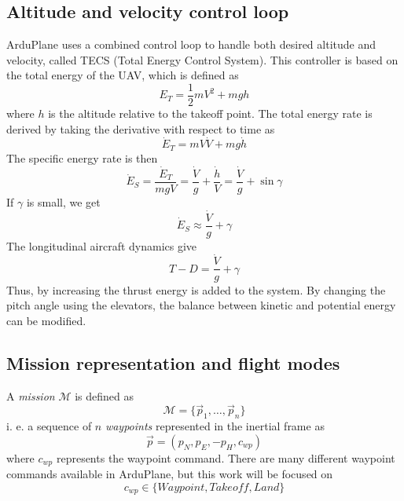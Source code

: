 \subsection{Altitude and velocity control loop}
ArduPlane uses a combined control loop to handle both desired altitude and velocity, called 
TECS (Total Energy Control System). This controller is based on the total energy of the UAV,
which is defined as
\begin{equation}
    E_T=\frac{1}{2}mV^2 + mgh
\end{equation}
where $h$ is the altitude relative to the takeoff point. The total energy rate is derived
by taking the derivative with respect to time as
\begin{equation}
    \dot{E}_T=mV\dot{V} + mg\dot{h}
\end{equation}
The specific energy rate is then
\begin{equation}
    \dot{E}_S = \frac{\dot{E}_T}{mgV} = \frac{\dot{V}}{g} + \frac{\dot{h}}{V} = \frac{\dot{V}}{g} + \sin\gamma
\end{equation}
If $\gamma$ is small, we get
\begin{equation}
    \dot{E}_S\approx\frac{\dot{V}}{g} + \gamma
\end{equation} 
The longitudinal aircraft dynamics give
\begin{equation}
    T-D=\frac{\dot{V}}{g} + \gamma
\end{equation}
Thus, by increasing the thrust
energy is added to the system. By changing the pitch angle using the elevators, the balance 
between kinetic and potential energy can be modified. 
\fi

\subsection{Mission representation and flight modes}
A \textit{mission} $\mathcal{M}$ is defined as 
\begin{equation}
    \mathcal{M} = \{\vec{p}_1, \hdots, \vec{p}_n\}
\end{equation}
i. e. a sequence of $n$ \textit{waypoints} represented in the inertial frame as 
\begin{equation}
    \vec{p}=(p_N, p_E, -p_H, c_{wp})
\end{equation}
where $c_{wp}$ represents the waypoint command. There are many different waypoint commands available
in ArduPlane, but this work will be focused on 
\begin{equation}
    c_{wp}\in \{Waypoint, Takeoff, Land\}
\end{equation}
